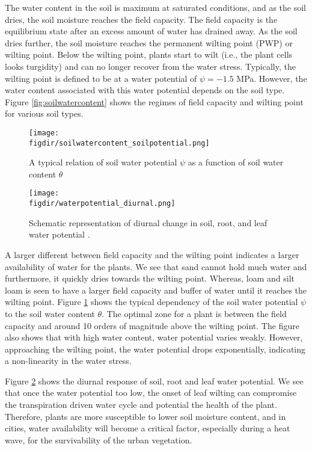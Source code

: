 The water content in the soil is maximum at saturated conditions, and as the soil dries, the soil moisture reaches the field capacity. The field capacity is the equilibrium state after an excess amount of water has drained away. As the soil dries further, the soil moisture reaches the permanent wilting point (PWP) or wilting point. Below the wilting point, plants start to wilt (i.e., the plant cells looks turgidity) and can no longer recover from the water stress. Typically, the wilting point is defined to be at a water potential of $\psi=-1.5$ \si{\MPa}. However, the water content associated with this water potential depends on the soil type. Figure \ref{fig:soilwatercontent} shows the regimes of field capacity and wilting point for various soil types. 
	
	\begin{figure}[p]
		\centering
		\texttt{[image: \\figdir/soilwatercontent\_soilpotential.png]}
		\caption{A typical relation of soil water potential $\psi$ as a function of soil water content $\theta$ }
		\label{fig:soilwatercontent_soilpotential}
	\end{figure}
	
	\begin{figure}[p]
		\centering
		\texttt{[image: \\figdir/waterpotential\_diurnal.png]}
		\caption{Schematic representation  of diurnal change in soil, root, and leaf water potential \citep{nobel2009physicochemical}.}
		\label{fig:waterpotential_diurnal}
	\end{figure}	
	
A larger different between field capacity and the wilting point indicates a larger availability of water for the plants. We see that sand cannot hold much water and furthermore, it quickly dries towards the wilting point. Whereas, loam and silt loam is seen to have a larger field capacity and buffer of water until it reaches the wilting point. Figure \ref{fig:soilwatercontent_soilpotential} shows the typical dependency of the soil water potential $\psi$ to the soil water content $\theta$. The optimal zone for a plant is between the field capacity and around 10 orders of magnitude above the wilting point. The figure also shows that with high water content, water potential varies weakly. However, approaching the wilting point, the water potential drops exponentially, indicating a non-linearity in the water stress. 

Figure \ref{fig:waterpotential_diurnal} shows the diurnal response of soil, root and leaf water potential. We see that once the water potential too low, the onset of leaf wilting can compromise the transpiration driven water cycle and potential the health of the plant. Therefore, plants are more susceptible to lower soil moisture content, and in cities, water availability will become a critical factor, especially during a heat wave, for the survivability of the urban vegetation. 

